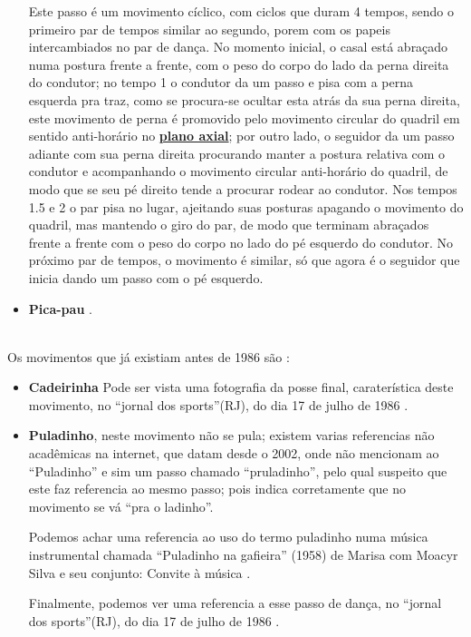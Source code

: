 \begin{itemize}
Este passo é um movimento cíclico, com ciclos que duram 4 tempos, 
sendo o primeiro par de tempos similar ao segundo, porem com os papeis intercambiados no par de dança.
No momento inicial, o casal está abraçado numa postura frente a frente, 
com o peso do corpo do lado da perna direita do condutor;
no tempo 1 o condutor da um passo e pisa com a perna esquerda pra traz, 
como se procura-se ocultar esta atrás da sua perna direita, 
este movimento de perna é promovido pelo movimento circular do quadril em sentido anti-horário no \hyperref[def:PlanoAxial]{\textbf{plano axial}};
por outro lado, 
o seguidor da um passo adiante com sua perna direita procurando manter a postura relativa com o condutor e acompanhando o movimento circular anti-horário do quadril, 
de modo que se seu pé direito tende a procurar rodear ao condutor.
Nos tempos 1.5 e 2 o par pisa no lugar, ajeitando suas posturas apagando o movimento do quadril, 
mas mantendo o giro do par, 
de modo que terminam abraçados  frente a frente com o peso do corpo no lado do pé esquerdo do condutor.
No próximo par de tempos, o movimento é similar, só que agora é o seguidor que inicia dando um passo com o pé esquerdo. 

\item \textbf{Pica-pau} . 
\end{itemize}~\\




Os movimentos que já existiam antes de 1986 são \cite[pp. 6]{gafieiraaredeout2}:
\begin{itemize}
\item \textbf{Cadeirinha} 
Pode ser vista uma fotografia da posse final, caraterística deste movimento, no ``jornal dos sports''(RJ),
do dia 17 de julho de 1986 \cite[pp. 6]{gafieiraaredeout2}.

\item \textbf{Puladinho}, 
neste movimento não se pula; 
existem varias referencias não acadêmicas na internet, que datam desde o 2002,
onde não mencionam ao ``Puladinho'' e sim um passo chamado ``pruladinho'', 
pelo qual suspeito que este faz referencia ao mesmo passo;
pois indica corretamente que no movimento se vá ``pra o ladinho''.

Podemos achar uma referencia ao uso do termo puladinho numa música instrumental chamada 
``Puladinho na gafieira'' (1958)  de  Marisa com Moacyr Silva e seu conjunto: Convite à música \cite{puladinhogafieiramusic}.

Finalmente, podemos ver uma referencia a esse passo de dança, no ``jornal dos sports''(RJ),
do dia 17 de julho de 1986 \cite[pp. 6]{gafieiraaredeout2}.
\end{itemize}~\\

